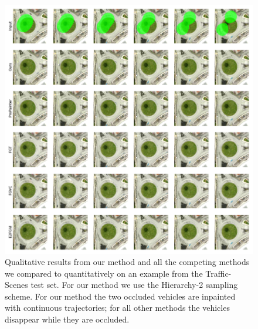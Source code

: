 \begin{figure}[h]
\begin{center}
    \centering
    \captionsetup{type=figure}
    \includegraphics[width=\linewidth]{figures/additional-samples/ts1.pdf}
    \caption[Qualitative results from our method and all competing methods on an example from the Traffic-Scenes test set.]{Qualitative results from our method and all the competing methods we compared to quantitatively on an example from the Traffic-Scenes test set. For our method we use the Hierarchy-2 sampling scheme. For our method the two occluded vehicles are inpainted with continuous trajectories; for all other methods the vehicles disappear while they are occluded.} 
    \label{fig:ts1}
\end{center}
\end{figure}

